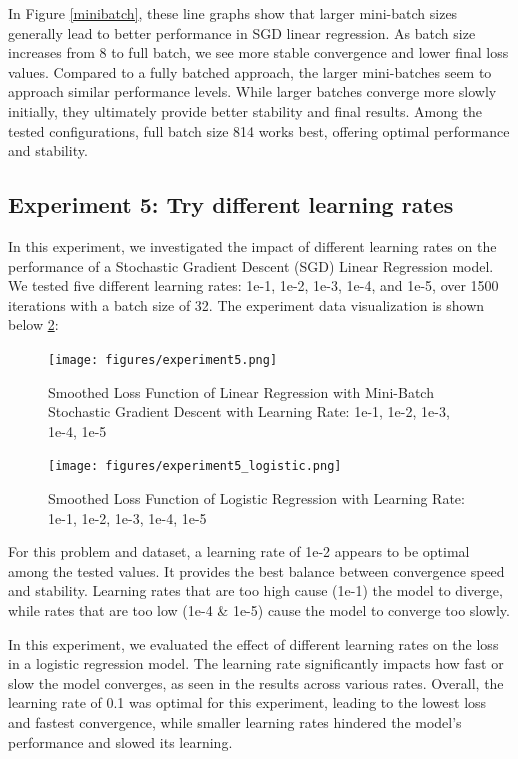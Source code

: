 \documentclass{article}
\begin{document}
In Figure \ref{minibatch}, these line graphs show that larger mini-batch sizes generally lead to better performance in SGD linear regression. As batch size increases from 8 to full batch, we see more stable convergence and lower final loss values. Compared to a fully batched approach, the larger mini-batches seem to approach similar performance levels. While larger batches converge more slowly initially, they ultimately provide better stability and final results. Among the tested configurations, full batch size 814 works best, offering optimal performance and stability.


\subsection{Experiment 5: Try different learning rates}
In this experiment, we investigated the impact of different learning rates on the performance of a Stochastic Gradient Descent (SGD) Linear Regression model. We tested five different learning rates: 1e-1, 1e-2, 1e-3, 1e-4, and 1e-5, over 1500 iterations with a batch size of 32. The experiment data visualization is shown below \ref{learning rate}:
\begin{figure}[H]
    \centering
    \texttt{[image: figures/experiment5.png]}
    \caption{Smoothed Loss Function of Linear Regression with Mini-Batch Stochastic Gradient Descent with Learning Rate: 1e-1, 1e-2, 1e-3, 1e-4, 1e-5}
    \label{learning rate}
\end{figure}

\begin{figure}[H]
    \centering
    \texttt{[image: figures/experiment5\_logistic.png]}
    \caption{Smoothed Loss Function of Logistic Regression with Learning Rate: 1e-1, 1e-2, 1e-3, 1e-4, 1e-5}
    \label{learning rate}
\end{figure}

For this problem and dataset, a learning rate of 1e-2 appears to be optimal among the tested values. It provides the best balance between convergence speed and stability. Learning rates that are too high cause (1e-1) the model to diverge, while rates that are too low (1e-4 \& 1e-5) cause the model to converge too slowly.

In this experiment, we evaluated the effect of different learning rates on the loss in a logistic regression model. The learning rate significantly impacts how fast or slow the model converges, as seen in the results across various rates. Overall, the learning rate of 0.1 was optimal for this experiment, leading to the lowest loss and fastest convergence, while smaller learning rates hindered the model’s performance and slowed its learning.
\end{document}
